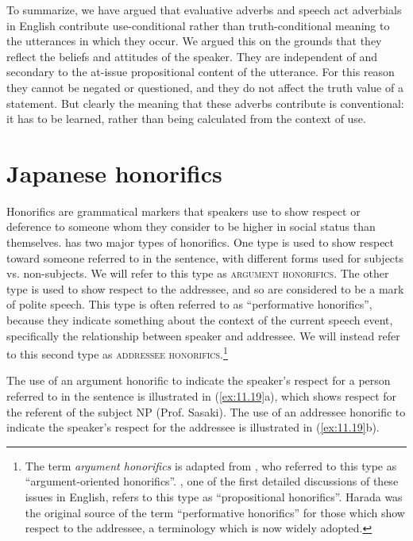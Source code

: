 To summarize, we have argued that evaluative adverbs and speech act adverbials in English contribute use-conditional rather than truth-conditional meaning to the utterances in which they occur. We argued this on the grounds that they reflect the beliefs and attitudes of the speaker. They are independent of and secondary to the at-issue propositional content of the utterance. For this reason they cannot be negated or questioned, and they do not affect the truth value of a statement. But clearly the meaning that these adverbs contribute is conventional: it has to be learned, rather than being calculated from the context of use.



\section{Japanese honorifics}\label{sec:11.3}

Honorifics are grammatical markers that speakers use to show respect or deference to someone whom they consider to be higher in social status than themselves.  has two major types of honorifics. One type is used to show respect toward someone referred to in the sentence, with different forms used for subjects vs. non-subjects. We will refer to this type as \textsc{argument honorifics}. The other type is used to show respect to the addressee, and so are considered to be a mark of polite speech. This type is often referred to as “performative honorifics”, because they indicate something about the context of the current speech event, specifically the relationship between speaker and addressee. We will instead refer to this second type as \textsc{addressee honorifics}.\footnote{The term \textit{argument honorifics} is adapted from \citet{Potts2005}, who referred to this type as “argument-oriented honorifics”. \citet{Harada1976}, one of the first detailed discussions of these issues in English, refers to this type as “propositional honorifics”. Harada was the original source of the term “performative honorifics” for those which show respect to the addressee, a terminology which is now widely adopted.}


The use of an argument honorific to indicate the speaker’s respect for a person referred to in the sentence is illustrated in (\ref{ex:11.19}a), which shows respect for the referent of the subject NP (Prof. {Sasaki}). The use of an addressee honorific to indicate the speaker’s respect for the addressee is illustrated in (\ref{ex:11.19}b).


